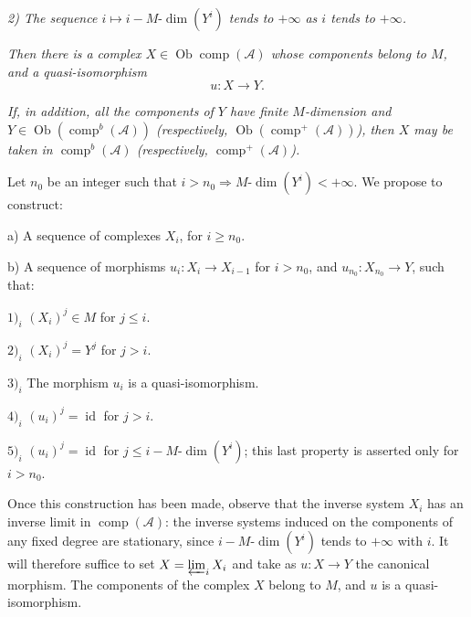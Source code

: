 \clearpage
{}%
\begingroup\small\setlength{\parskip}{0pt}\setlength{\emergencystretch}{1.5em}
\setlength{\abovedisplayskip}{4pt plus 2pt minus 2pt}%
\setlength{\belowdisplayskip}{4pt plus 2pt minus 2pt}%

\noindent\textit{2) The sequence $i\longmapsto i-M\text{-}\dim(Y^i)$ tends
to $+\infty$ as $i$ tends to $+\infty$.}

\textit{Then there is a complex
$X\in\operatorname{Ob}\operatorname{comp}(\mathcal A)$ whose components
belong to $M$, and a quasi-isomorphism}
\[
u\colon X\longrightarrow Y.
\]

\textit{If, in addition, all the components of $Y$ have finite
$M$-dimension and
$Y\in\operatorname{Ob}(\operatorname{comp}^{b}(\mathcal A))$
(respectively, $\operatorname{Ob}(\operatorname{comp}^{+}(\mathcal A))$),
then $X$ may be taken in $\operatorname{comp}^{b}(\mathcal A)$
(respectively, $\operatorname{comp}^{+}(\mathcal A)$).}

Let $n_0$ be an integer such that
$i>n_0\Rightarrow M\text{-}\dim(Y^i)<+\infty$. We propose to construct:

\noindent a) A sequence of complexes $X_i$, for $i\geq n_0$.

\noindent b) A sequence of morphisms
$u_i\colon X_i\longrightarrow X_{i-1}$ for $i>n_0$, and
$u_{n_0}\colon X_{n_0}\longrightarrow Y$, such that:

\noindent $1)_i$ $(X_i)^j\in M$ for $j\leq i$.

\noindent $2)_i$ $(X_i)^j=Y^j$ for $j>i$.

\noindent $3)_i$ The morphism $u_i$ is a quasi-isomorphism.

\noindent $4)_i$ $(u_i)^j=\operatorname{id}$ for $j>i$.

\noindent $5)_i$ $(u_i)^j=\operatorname{id}$ for
$j\leq i-M\text{-}\dim(Y^i)$; this last property is asserted only for
$i>n_0$.

Once this construction has been made, observe that the inverse system $X_i$
has an inverse limit in $\operatorname{comp}(\mathcal A)$: the inverse
systems induced on the components of any fixed degree are stationary, since
$i-M\text{-}\dim(Y^i)$ tends to $+\infty$ with $i$. It will therefore suffice
to set $X=\varprojlim_i X_i$ and take as
$u\colon X\longrightarrow Y$ the canonical morphism. The components of the
complex $X$ belong to $M$, and $u$ is a quasi-isomorphism.

